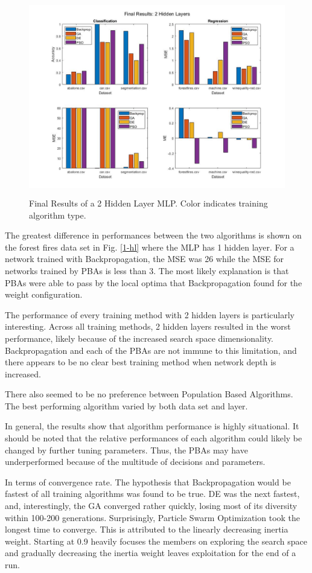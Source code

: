 \documentclass[twoside,11pt]{article}
\begin{document}
	\begin{figure}[h]
		\centering
		\includegraphics[height=3.4in]{FINAL_FIGS/2_hl.jpg}
		\caption{Final Results of a 2 Hidden Layer MLP. Color indicates training algorithm type.}
		\label{2-hl}
	\end{figure}

	The greatest difference in performances between the two algorithms is shown on the forest fires data set in Fig. \ref{1-hl} where the MLP has 1 hidden layer.
	For a network trained with Backpropagation, the MSE was 26 while the MSE for networks trained by PBAs is less than 3.
	The most likely explanation is that PBAs were able to pass by the local optima that Backpropagation found for the weight configuration.

	The performance of every training method with 2 hidden layers is particularly interesting. Across all training methods, 2 hidden layers resulted in the worst performance, likely because of the increased search space dimensionality. Backpropagation and each of the PBAs are not immune to this limitation, and there appears to be no clear best training method when network depth is increased.
	
	There also seemed to be no preference between Population Based Algorithms. The best performing algorithm varied by both data set and layer.

	In general, the results show that algorithm performance is highly situational. It should be noted that the relative performances of each algorithm could likely be changed by further tuning parameters. Thus, the PBAs may have underperformed because of the multitude of decisions and parameters.
	
	In terms of convergence rate. The hypothesis that Backpropagation would be fastest of all training algorithms was found to be true. DE was the next fastest, and, interestingly, the GA converged rather quickly, losing most of its diversity within 100-200 generations.
	Surprisingly, Particle Swarm Optimization took the longest time to converge. This is attributed to the linearly decreasing inertia weight.
	Starting at 0.9 heavily focuses the members on exploring the search space and gradually decreasing the inertia weight leaves exploitation for the end of a run.
\end{document}
